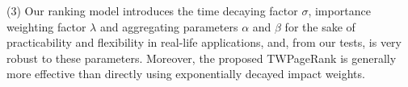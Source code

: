 


\sstab(3) Our ranking model \ensemblerank introduces the time decaying factor $\sigma$, importance weighting factor $\lambda$ and aggregating parameters $\alpha$ and $\beta$ for the sake of practicability and flexibility in real-life applications, and, from our tests, \ensemblerank is very robust to these parameters. Moreover, the proposed TWPageRank is generally more effective than directly using exponentially decayed impact weights.



